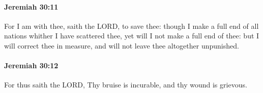 		\paragraph{Jeremiah 30:11} %
			\label{JEREMIAH-30-11}

			For I am with thee, saith the LORD, to save thee: though I make a full end of all nations whither I have scattered thee, yet will I not make a full end of thee: but I will correct thee in measure, and will not leave thee altogether unpunished.


		\paragraph{Jeremiah 30:12} %
			\label{JEREMIAH-30-12}

			For thus saith the LORD, Thy bruise is incurable, and thy wound is grievous.


